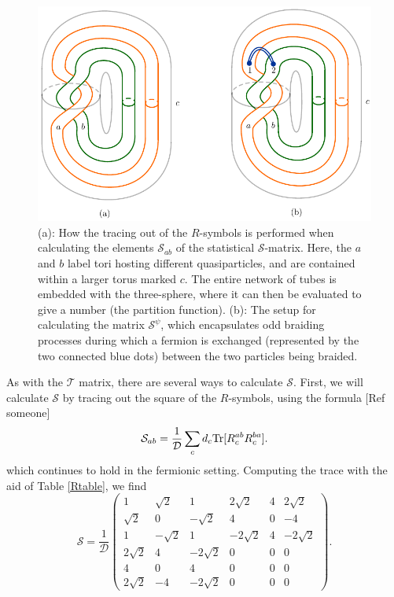 \documentclass[12pt,a4paper]{article}
\newcommand{\mcd}{\mathcal{D}}
\newcommand{\mct}{\mathcal{T}}
\newcommand{\mcs}{\mathcal{S}}
\newcommand\be            {\begin{equation}}
\newcommand\ee            {\end{equation}}
\begin{document}
\begin{figure}
\begin{center}
\includegraphics{both_braided_tubes.pdf}
\caption{\label{braided_tubes} 
(a): How the tracing out of the $R$-symbols is performed when calculating the elements $\mcs_{ab}$ of the statistical $\mcs$-matrix. 
Here, the $a$ and $b$ label tori hosting different quasiparticles, and are contained within a larger torus marked $c$. 
The entire network of tubes is embedded with the three-sphere, where it can then be evaluated to give a number (the partition function). 
(b): The setup for calculating the matrix $\mcs^\psi$, which encapsulates odd braiding processes during which a fermion is exchanged (represented by the two connected blue dots) between the two particles being braided. }
\end{center}
\end{figure}

As with the $\mct$ matrix, there are 
several ways to calculate $\mcs$. 
First, we will calculate $\mcs$ by tracing out the square of the $R$-symbols, using the formula [Ref someone]
\be \label{Smattr} \mcs_{ab} = \frac{1}{\mcd}\sum_{c}d_c{\rm Tr}[R^{ab}_cR^{ba}_c].\ee
which continues to hold in the fermionic setting. 
Computing the trace with the aid of Table \ref{Rtable}, we find
\be \label{statistical_S}
 \mcs= \frac{1}{\mcd} \begin{pmatrix} 
1&\sqrt{2}&1&2\sqrt{2}&4&2\sqrt{2} \\
 \sqrt{2}&0&-\sqrt{2}&4&0&-4 \\ 
 1&-\sqrt{2}&1&-2\sqrt{2}&4&-2\sqrt{2} \\ 
 2\sqrt{2}&4& -2\sqrt{2}&0&0&0 \\ 
 4&0&4&0&0&0 \\ 
  2\sqrt{2}&-4&- 2\sqrt{2}&0 & 0 & 0 \end{pmatrix}. \ee
  
\end{document}
